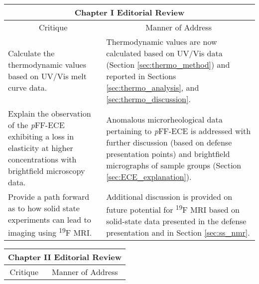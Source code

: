 \begin{landscape}
\renewcommand{\arraystretch}{1.5}
\begin{table}[h!]
    \centering
    \begin{tabular}{ p{} p{} }
    \hline
    \multicolumn{2}{c}{Chapter I Editorial Review} \\
    \hline
    \multicolumn{1}{c}{Critique} &
    \multicolumn{1}{c}{Manner of Address} \\
    \hline
    
    Calculate the thermodynamic values based on UV/Vis melt curve data.
    &
    Thermodynamic values are now calculated based on UV/Vis data (Section
    \ref{sec:thermo_method}) and reported in Sections \ref{sec:thermo_analysis},
    and \ref{sec:thermo_discussion}.
    \\

    Explain the observation of the \emph{p}FF-ECE exhibiting a loss in
    elasticity at higher concentrations with brightfield microscopy data.
    &
    Anomalous microrheological data pertaining to \emph{p}FF-ECE is addressed
    with further discussion (based on defense presentation points) and
    brightfield micrographs of sample groups (Section \ref{sec:ECE_explanation}).
    \\

    Provide a path forward as to how solid state experiments can lead to imaging
    using \textsuperscript{19}F MRI.
    &
    Additional discussion is provided on future potential for
    \textsuperscript{19}F MRI based on solid-state data presented in the defense
    presentation and in Section \ref{sec:ss_nmr}.
    \\

    \hline
\end{tabular}
\end{table}
\renewcommand{\arraystretch}{1.5}
\begin{table}[h!]
    \centering
    \begin{tabular}{ p{} p{} }
    \hline
    \multicolumn{2}{c}{Chapter II Editorial Review} \\
    \hline
    \multicolumn{1}{c}{Critique} &
    \multicolumn{1}{c}{Manner of Address} \\
    \hline
    

\end{tabular}
\end{table}
\end{landscape}

